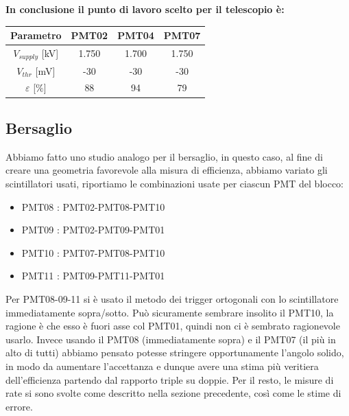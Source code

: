 \documentclass[10pt,a4paper]{article}
\begin{document}
\begin{center}
\vspace{1.2cm}

\textbf{In conclusione il punto di lavoro scelto per il telescopio è:}

\vspace{0.6cm}

\begin{tabular}{|c|c|c|c|}
\toprule
Parametro & PMT02 & PMT04 & PMT07 \\
\midrule
$V_{supply}$ [kV] & 1.750 & 1.700 & 1.750 \\
$V_{thr}$ [mV] & -30 & -30 & -30 \\
$\varepsilon$ [$\%$] & 88 & 94 & 79 \\
\bottomrule
\end{tabular}

\end{center}


\subsection{Bersaglio}

Abbiamo fatto uno studio analogo per il bersaglio, in questo caso, al fine di creare una geometria favorevole alla misura di efficienza, abbiamo variato gli scintillatori usati, riportiamo le combinazioni usate per ciascun PMT del blocco:

\begin{itemize}

\item PMT08 : PMT02-PMT08-PMT10 
\item PMT09 : PMT02-PMT09-PMT01
\item PMT10 : PMT07-PMT08-PMT10
\item PMT11 : PMT09-PMT11-PMT01

\end{itemize}

Per PMT08-09-11 si è usato il metodo dei trigger ortogonali con lo scintillatore immediatamente sopra/sotto.
Può sicuramente sembrare insolito il PMT10, la ragione è che esso è fuori asse col PMT01, quindi non ci è sembrato ragionevole usarlo. Invece usando il PMT08 (immediatamente sopra) e il PMT07 (il più in alto di tutti) abbiamo pensato potesse stringere opportunamente l'angolo solido, in modo da aumentare l'accettanza e dunque avere una stima più veritiera dell'efficienza partendo dal rapporto triple su doppie. 
Per il resto, le misure di rate si sono svolte come descritto nella sezione precedente, così come le stime di errore.
\end{document}
